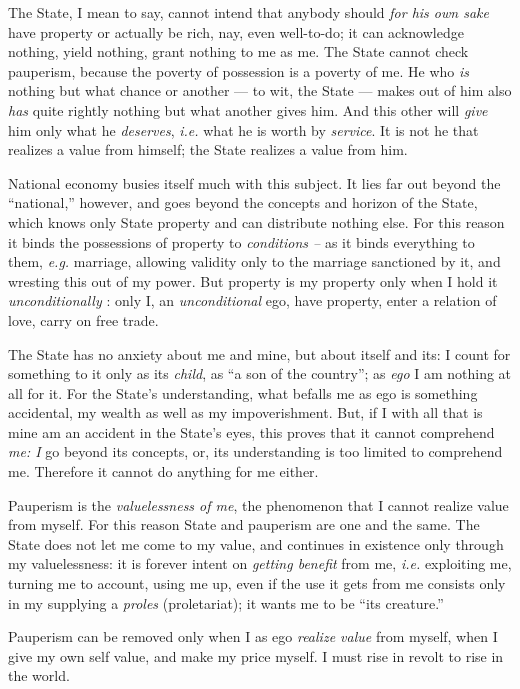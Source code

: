 The State, I mean to say, cannot intend that anybody should \textit{for his 
own sake} have property or actually be rich, nay, even well-to-do; it can 
acknowledge nothing, yield nothing, grant nothing to me as me. The State 
cannot check pauperism, because the poverty of possession is a poverty of me. 
He who \textit{is} nothing but what chance or another --- to wit, the State --- makes out of him also \textit{has} quite rightly nothing but what another 
gives him. And this other will \textit{give} him only what he 
\textit{deserves}, \textit{i.e.} what he is worth by \textit{service}. It is 
not he that realizes a value from himself; the State realizes a value from 
him.

National economy busies itself much with this subject. It lies far out beyond 
the ``national,'' however, and goes beyond the concepts and horizon of the 
State, which knows only State property and can distribute nothing else. For 
this reason it binds the possessions of property to \textit{conditions --} as 
it binds everything to them, \textit{e.g.} marriage, allowing validity only 
to the marriage sanctioned by it, and wresting this out of my power. But 
property is my property only when I hold it \textit{unconditionally} : only I, 
an \textit{unconditional} ego, have property, enter a relation of love, carry 
on free trade.

The State has no anxiety about me and mine, but about itself and its: I count 
for something to it only as its \textit{child}, as ``a son of the country''; 
as \textit{ego} I am nothing at all for it. For the State's understanding, 
what befalls me as ego is something accidental, my wealth as well as my 
impoverishment. But, if I with all that is mine am an accident in the State's 
eyes, this proves that it cannot comprehend \textit{me: I} go beyond its 
concepts, or, its understanding is too limited to comprehend me. Therefore it 
cannot do anything for me either.

Pauperism is the \textit{valuelessness of me}, the phenomenon that I cannot 
realize value from myself. For this reason State and pauperism are one and the 
same. The State does not let me come to my value, and continues in existence 
only through my valuelessness: it is forever intent on \textit{getting 
benefit} from me, \textit{i.e.} exploiting me, turning me to account, using me 
up, even if the use it gets from me consists only in my supplying a 
\textit{proles} (proletariat); it wants me to be ``its creature.''

Pauperism can be removed only when I as ego \textit{realize value} from 
myself, when I give my own self value, and make my price myself. I must rise 
in revolt to rise in the world.

